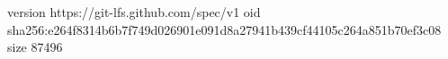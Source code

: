 version https://git-lfs.github.com/spec/v1
oid sha256:e264f8314b6b7f749d026901e091d8a27941b439cf44105c264a851b70ef3c08
size 87496
